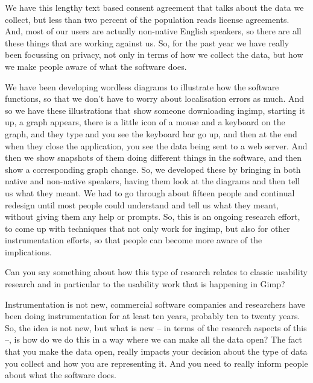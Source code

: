 {We have this lengthy text based consent agreement that talks about the
data we collect, but less than two percent of the population reads
license agreements. And, most of our users are actually non{}-native
English speakers, so there are all these things that are working
against us. So, for the past year we have really been focussing on
privacy, not only in terms of how we collect the data, but how we make
people aware of what the software does.\par 

We have been developing wordless diagrams to illustrate how the software
functions, so that we don't have to worry about localisation errors as
much. And so we have these illustrations that show someone downloading
ingimp, starting it up, a graph appears, there is a little icon of a
mouse and a keyboard on the graph, and they type and you see the
keyboard bar go up, and then at the end when they close the
application, you see the data being sent to a web server. And then we
show snapshots of them doing different things in the software, and then
show a corresponding graph change. So, we developed these by bringing
in both native and non{}-native speakers, having them look at the
diagrams and then tell us what they meant. We had to go through about
fifteen people and continual redesign until most people could
understand and tell us what they meant, without giving them any help or
prompts. So, this is an ongoing research effort, to come up with
techniques that not only work for ingimp, but also for other
instrumentation efforts, so that people can become more aware of the
implications.\par 

 Can you say something about how this type of research relates to
classic usability research and in particular to the usability work that
is happening in Gimp?\par

 Instrumentation is not new, commercial software companies and
researchers have been doing instrumentation for at least ten years,
probably ten to twenty years. So, the idea is not new, but what is new
{--} in terms of the research aspects of this {--}, is how do we do
this in a way where we can make all the data open? The fact that you
make the data open, really impacts your decision about the type of data
you collect and how you are representing it. And you need to really
inform people about what the software does.\par

}
